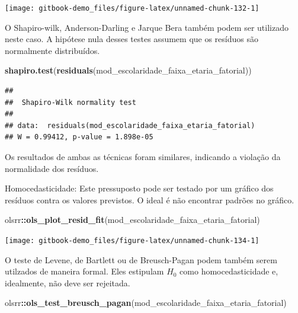 \documentclass[
]{book}
\newenvironment{Shaded}{\begin{snugshade}}{\end{snugshade}}
\newcommand{\KeywordTok}[1]{\textcolor[rgb]{0.13,0.29,0.53}{\textbf{#1}}}
\newcommand{\NormalTok}[1]{#1}
\newcommand{\OperatorTok}[1]{\textcolor[rgb]{0.81,0.36,0.00}{\textbf{#1}}}
\begin{document}
\begin{center}\texttt{[image: gitbook-demo\_files/figure-latex/unnamed-chunk-132-1]} \end{center}

O Shapiro-wilk, Anderson-Darling e Jarque Bera também podem ser
utilizado neste caso. A hipótese nula desses testes assumem que os
resíduos são normalmente distribuídos.

\begin{Shaded}
\begin{Highlighting}[]
\KeywordTok{shapiro.test}\NormalTok{(}\KeywordTok{residuals}\NormalTok{(mod_escolaridade_faixa_etaria_fatorial))}
\end{Highlighting}
\end{Shaded}

\begin{verbatim}
## 
##  Shapiro-Wilk normality test
## 
## data:  residuals(mod_escolaridade_faixa_etaria_fatorial)
## W = 0.99412, p-value = 1.898e-05
\end{verbatim}

Os resultados de ambas as técnicas foram similares, indicando a violação
da normalidade dos resíduos.

Homocedasticidade: Este pressuposto pode ser testado por um gráfico dos
resíduos contra os valores previstos. O ideal é não encontrar padrões no
gráfico.

\begin{Shaded}
\begin{Highlighting}[]
\NormalTok{olsrr}\OperatorTok{::}\KeywordTok{ols_plot_resid_fit}\NormalTok{(mod_escolaridade_faixa_etaria_fatorial)}
\end{Highlighting}
\end{Shaded}

\begin{center}\texttt{[image: gitbook-demo\_files/figure-latex/unnamed-chunk-134-1]} \end{center}

O teste de Levene, de Bartlett ou de Breusch-Pagan podem também serem
utilzados de maneira formal. Eles estipulam \(H_0\) como
homocedasticidade e, idealmente, não deve ser rejeitada.

\begin{Shaded}
\begin{Highlighting}[]
\NormalTok{olsrr}\OperatorTok{::}\KeywordTok{ols_test_breusch_pagan}\NormalTok{(mod_escolaridade_faixa_etaria_fatorial)}
\end{Highlighting}
\end{Shaded}
\end{document}
